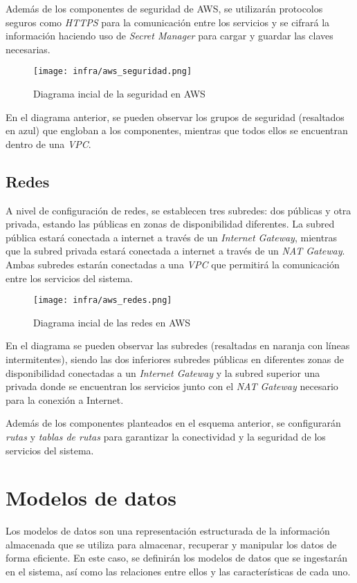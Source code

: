 Además de los componentes de seguridad de AWS, se utilizarán protocolos seguros
como \textit{HTTPS} para la comunicación entre los servicios y se cifrará la
información haciendo uso de \textit{Secret Manager} para cargar y guardar las
claves necesarias.


\begin{figure}[H]
	\centerline{\texttt{[image: infra/aws\_seguridad.png]}}
	\caption{Diagrama incial de la seguridad en AWS}
	\label{fig:aws_seguridad}
\end{figure}

En el diagrama anterior, se pueden observar los grupos de seguridad (resaltados
en azul) que engloban a los componentes, mientras que todos ellos se encuentran
dentro de una \textit{VPC}.

\subsection{Redes}
A nivel de configuración de redes, se establecen tres subredes: dos públicas y
otra privada, estando las públicas en zonas de disponibilidad diferentes. La
subred pública estará conectada a internet a través de un
\textit{Internet Gateway}, mientras que la subred privada estará conectada a
internet a través de un \textit{NAT Gateway}. Ambas subredes estarán conectadas
a una \textit{VPC} que permitirá la comunicación entre los servicios del
sistema.

\begin{figure}[H]
	\centerline{\texttt{[image: infra/aws\_redes.png]}}
	\caption{Diagrama incial de las redes en AWS}
	\label{fig:aws_redes}
\end{figure}

En el diagrama se pueden observar las subredes (resaltadas en naranja con líneas
intermitentes), siendo las dos inferiores subredes públicas en diferentes zonas
de disponibilidad conectadas a un \textit{Internet Gateway} y la subred superior
una privada donde se encuentran los servicios junto con el \textit{NAT Gateway}
necesario para la conexión a Internet.

Además de los componentes planteados en el esquema anterior, se configurarán
\textit{rutas} y \textit{tablas de rutas} para garantizar la conectividad y la
seguridad de los servicios del sistema.


\newpage{}
\section{Modelos de datos}\label{sec:modelo}
Los modelos de datos son una representación estructurada de la información
almacenada que se utiliza para almacenar, recuperar y manipular los datos de
forma eficiente. En este caso, se definirán los modelos de datos que se
ingestarán en el sistema, así como las relaciones entre ellos y las
características de cada uno.


